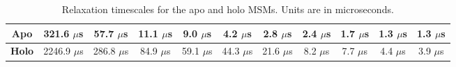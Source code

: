 \begin{table}
\centering
\begin{tabular}{|c|c|c|c|c|c|c|c|c|c|c|}
\hline
\textbf{Apo} & 321.6 $\mu$s & 57.7 $\mu$s & 11.1 $\mu$s & 9.0 $\mu$s & 4.2 $\mu$s & 2.8 $\mu$s & 2.4 $\mu$s & 1.7 $\mu$s & 1.3 $\mu$s & 1.3 $\mu$s\\ \hline
\textbf{Holo} & 2246.9 $\mu$s & 286.8 $\mu$s & 84.9 $\mu$s & 59.1 $\mu$s & 44.3 $\mu$s & 21.6 $\mu$s & 8.2 $\mu$s & 7.7 $\mu$s & 4.4 $\mu$s & 3.9 $\mu$s \\ \hline
\end{tabular}
\caption{Relaxation timescales for the apo and holo MSMs. Units are in microseconds.}
\label{table:relaxation_timescales}
\end{table}
